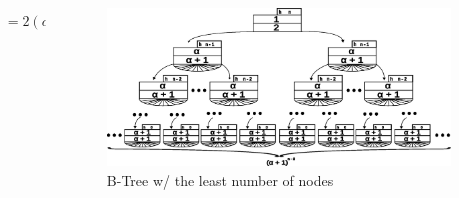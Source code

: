 \begin{frame}
\begin{columns}
\begin{column}{0.5\textwidth}
\begin{block}{}
\[\begin{aligned}
                        &= 2\left(\alpha + 1\right)^{h - 1} - 1
                    \end{aligned}
                \]
            \end{block}
        \end{column}
        \begin{column}{0.5\textwidth}
            \begin{figure}
                \includegraphics[width=0.95\linewidth,keepaspectratio]{resources/made/generic_min_btree.eps}
                \caption[]{B-Tree w/ the least number of nodes}
            \end{figure}
        \end{column}
    \end{columns}

    \framebreak


\end{frame}
